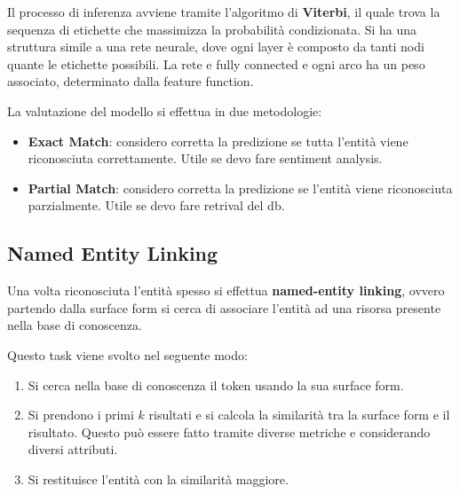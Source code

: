 Il processo di inferenza avviene tramite l'algoritmo di \textbf{Viterbi}, il quale
trova la sequenza di etichette che massimizza la probabilità condizionata. Si ha
una struttura simile a una rete neurale, dove ogni layer è composto da tanti nodi
quante le etichette possibili. La rete e fully connected e ogni arco ha un peso
associato, determinato dalla feature function.

La valutazione del modello si effettua in due metodologie:
\begin{itemize}
      \item \textbf{Exact Match}: considero corretta la predizione se tutta l'entità
            viene riconosciuta correttamente. Utile se devo fare sentiment analysis.
      \item \textbf{Partial Match}: considero corretta la predizione se l'entità
            viene riconosciuta parzialmente. Utile se devo fare retrival del db.
\end{itemize}
\subsection{Named Entity Linking}
Una volta riconosciuta l'entità spesso si effettua \textbf{named-entity linking},
ovvero partendo dalla surface form si cerca di associare l'entità ad una risorsa
presente nella base di conoscenza.

Questo task viene svolto nel seguente modo:
\begin{enumerate}
      \item Si cerca nella base di conoscenza il token usando la sua surface form.
      \item Si prendono i primi $k$ risultati e si calcola la similarità tra
            la surface form e il risultato. Questo può essere fatto tramite
            diverse metriche e considerando diversi attributi.
      \item Si restituisce l'entità con la similarità maggiore.
\end{enumerate}

